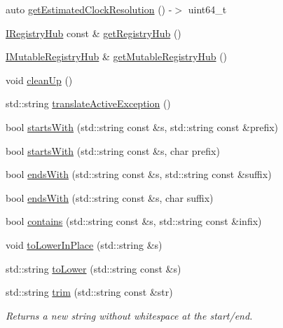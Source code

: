 \begin{DoxyCompactItemize}
\item 
auto \mbox{\hyperlink{namespace_catch_ac8e1ed37624bd0d97b2c0d4ec099d31f}{get\+Estimated\+Clock\+Resolution}} () -\/$>$ uint64\+\_\+t
\item 
\mbox{\hyperlink{struct_catch_1_1_i_registry_hub}{I\+Registry\+Hub}} const  \& \mbox{\hyperlink{namespace_catch_a6332c92ab0c3952586b22cb96fdb8d44}{get\+Registry\+Hub}} ()
\item 
\mbox{\hyperlink{struct_catch_1_1_i_mutable_registry_hub}{I\+Mutable\+Registry\+Hub}} \& \mbox{\hyperlink{namespace_catch_ac9ddcc6d66079add9cb2a3140b8ae51e}{get\+Mutable\+Registry\+Hub}} ()
\item 
void \mbox{\hyperlink{namespace_catch_a0f78e9afdebc6d4512d18e76fbf54b8c}{clean\+Up}} ()
\item 
std\+::string \mbox{\hyperlink{namespace_catch_adafff91485eeeeb9e9333f317cc0e3b1}{translate\+Active\+Exception}} ()
\item 
bool \mbox{\hyperlink{namespace_catch_a695f62327be0676e046291eeaae15110}{starts\+With}} (std\+::string const \&s, std\+::string const \&prefix)
\item 
bool \mbox{\hyperlink{namespace_catch_acad23751846ac23d0f379e34f5adebb1}{starts\+With}} (std\+::string const \&s, char prefix)
\item 
bool \mbox{\hyperlink{namespace_catch_ada025504f627feaf9ac68ca391515dff}{ends\+With}} (std\+::string const \&s, std\+::string const \&suffix)
\item 
bool \mbox{\hyperlink{namespace_catch_afd801a3e33fd7a8b91ded0d02747a93f}{ends\+With}} (std\+::string const \&s, char suffix)
\item 
bool \mbox{\hyperlink{namespace_catch_aa52974b0e426e7e2fbd725a900e9c36e}{contains}} (std\+::string const \&s, std\+::string const \&infix)
\item 
void \mbox{\hyperlink{namespace_catch_a0760dbe87d090a55a35414db57d272c4}{to\+Lower\+In\+Place}} (std\+::string \&s)
\item 
std\+::string \mbox{\hyperlink{namespace_catch_ac036a17412d318598ffda8e1fe7a1177}{to\+Lower}} (std\+::string const \&s)
\item 
std\+::string \mbox{\hyperlink{namespace_catch_a084108b47f37d8bfd5db51c50c7451b3}{trim}} (std\+::string const \&str)
\begin{DoxyCompactList}\small\item\em Returns a new string without whitespace at the start/end. \end{DoxyCompactList}\item 

\end{DoxyCompactItemize}
